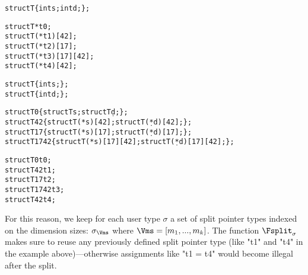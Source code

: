 \begin{docpart}
\begin{center}
\small
\begin{minipage}[t]{.3\textwidth}
\begin{alltt}
struct T \verb"{" int s; int d; \verb"}";







struct T  *t0;
struct T (*t1)[42];
struct T (*t2)[17];
struct T (*t3)[17][42];
struct T (*t4)[42];
\end{alltt}
\end{minipage}\hfil
\begin{minipage}[t]{.68\textwidth}
\begin{alltt}
struct T\s \verb"{" int s; \verb"}";
struct T\d \verb"{" int d; \verb"}";

struct T0    \verb"{" struct T\s  *s;          struct T\d  *d; \verb"}";
struct T42   \verb"{" struct T\s (*s)[42];     struct T\d (*d)[42]; \verb"}";
struct T17   \verb"{" struct T\s (*s)[17];     struct T\d (*d)[17]; \verb"}";
struct T1742 \verb"{" struct T\s (*s)[17][42]; struct T\d (*d)[17][42]; \verb"}";

struct T0    t0;
struct T42   t1;
struct T17   t2;
struct T1742 t3;
struct T42   t4;
\end{alltt}
\end{minipage}
\end{center}
For this reason, we keep for each user type $\sigma$ a set of split pointer
types indexed on the dimension sizes: $\sigma_{\Vms}$ where $\Vms =
[m_1,...,m_k]$. The function $\Fsplit_{\sigma}$ makes sure to reuse any
previously defined split pointer type (like "t1" and "t4" in the example
above)---otherwise assignments like "t1 = t4" would become illegal after
the split.


\end{docpart}
